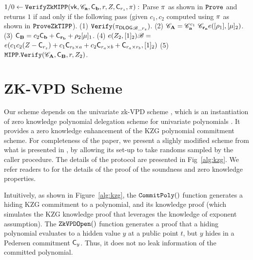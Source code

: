 \begin{small}
\begin{algorithm}[bt]
$1/0 \leftarrow {\mathtt{VerifyZkMIPP}}(\mathsf{vk}, 
	{\mathscr{C}}_{{{\mathbf {a}}}}, 
	{\mathsf{C}}_{{{\mathbf {b}}}}, r, Z, {\mathsf{C}}_{r_z}, \pi):$  \newline
	Parse $\pi$ as shown in $\texttt{Prove}$ and returns $1$
	if and only if the following pass (given $c_1, c_2$ computed
	using $\pi$ as shown in ${\mathtt{ProveZkTIPP}}$).  \newline
	(1) $\texttt{Verify}({\pi_{\textsf{DLOG}}}_{{\mathscr{B}}\_{r_z}})$.  \newline
	(2) ${\mathscr{C}}_{{\mathbf {A}}} =  {\mathscr{C}}_{{\mathbf {a}}}^{c_1}  ~{\mathscr{C}}_{{\mathbf {r_a}}}
		 e([\rho_1], [\mu]_2)$. \newline
	(3) ${\mathsf{C}}_{{\mathbf {B}}} =  {c_2} {\mathsf{C}}_{{\mathbf {b}}} + {\mathsf{C}}_{{\mathbf {r_b}}} +
		 \rho_2 [\mu]_1$. \newline
	(4) $e(Z_2, [1]_2) {\mathscr{B}} =$ \newline 
			\hspace*{0.1in} $e(c_1c_2(Z - {\mathsf{C}}_{r_z}) +
			c_1{\mathsf{C}}_{r_b \times a} +
			c_2{\mathsf{C}}_{r_a \times b} + 
			{\mathsf{C}}_{r_a \times r_b}, 
			[1]_2)$ \newline
			\newline
	(5) ${\mathtt{MIPP}}.\texttt{Verify}({\mathscr{C}}_{{\mathbf {A}}}, {\mathsf{C}}_{{\mathbf {B}}}, r, Z_2)$.
\caption{Zero Knowledge MIPP Protocol}
\label{fig_zkmipp}
\end{algorithm}
\end{small}

\section{ZK-VPD Scheme}
\label{sec:zkvpd}
Our scheme depends on the univariate zk-VPD scheme
\cite{Zkreg}, which is an instantiation of zero knowledge 
polynomial delegation scheme for univariate polynomials \cite{zkvsql}.
It provides a zero knowledge enhancement
of the KZG polynomial commitment scheme. For completeness of the paper,
we present a slighly modified scheme from what is presented in
\cite{Zkreg,zkvsql}, by allowing its set-up to take
randoms sampled by the caller procedure. The details
of the protocol 
are presented in Fig\ \ref{alg:kzg}. We refer readers to
\cite{Zkreg,zkvsql} for the details of the proof of the soundness and
zero knowledge properties.

Intuitively, as shown in Figure\ \ref{alg:kzg}, the $\texttt{CommitPoly}()$
function generates a hiding KZG commitment to a polynomial, and
its knowledge proof (which simulates the KZG knowledge proof
that leverages the knowledge of exponent assumption). 
The $\texttt{ZkVPDOpen}()$ function generates a proof that
a hiding polynomial evaluates to a hidden value $y$
at a public point $t$, but $y$ hides in a Pedersen
commitment ${\mathsf{C}}_y$. Thus, it does not no leak information
of the committed polynomial.

